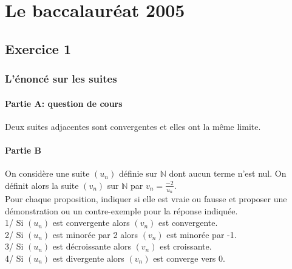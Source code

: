 \documentclass[a4paper,11pt]{book}
\begin{document}
\chapter{Le baccalaur\'eat 2005}
\section{Exercice 1}
\subsection{L'\'enonc\'e sur les suites}
\subsubsection{Partie A: question de cours}
Deux suites adjacentes sont convergentes et elles ont la m\^eme limite.
\subsubsection{Partie B}
On consid\`ere une suite $(u_n)$ d\'efinie sur $\mathbb N$ dont aucun terme 
n'est nul. On d\'efinit alors la suite $(v_n)$ sur $\mathbb N$ par
 $v_n=\frac{-2}{u_n}$.\\
Pour chaque proposition, indiquer si elle est vraie ou fausse et proposer 
une d\'emonstration ou un contre-exemple pour la r\'eponse indiqu\'ee.\\
1/ Si $(u_n)$ est convergente alors $(v_n)$ est convergente.\\
2/ Si $(u_n)$ est minor\'ee par 2 alors $(v_n)$ est minor\'ee par -1.\\
3/ Si $(u_n)$ est d\'ecroissante alors $(v_n)$ est croissante.\\
4/ Si $(u_n)$ est divergente alors $(v_n)$ est converge vers 0.\\
 
\end{document}

